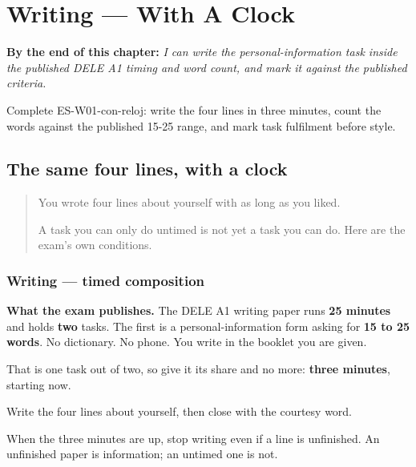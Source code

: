 
\chapter{Writing --- With A Clock}
\label{ch:escribir-con-reloj}

\begin{chapteropening}
\textbf{By the end of this chapter:} \emph{I can write the personal-information task inside the published DELE A1 timing and word count, and mark it against the published criteria.}

Complete ES-W01-con-reloj: write the four lines in three minutes, count the words against the published 15-25 range, and mark task fulfilment before style.
\end{chapteropening}

\section[Practice]{The same four lines, with a clock}

\label{lesson:ES-W01-con-reloj}



\begin{quote}
You wrote four lines about yourself with as long as you liked.

A task you can only do untimed is not yet a task you can do. Here are the exam's own conditions.
\end{quote}

\subsection*{Writing — timed composition}
\textbf{What the exam publishes.} The DELE A1 writing paper runs \textbf{25 minutes} and holds \textbf{two} tasks. The first is a personal-information form asking for \textbf{15 to 25 words}. No dictionary. No phone. You write in the booklet you are given.

That is one task out of two, so give it its share and no more: \textbf{three minutes}, starting now.

Write the four lines about yourself, then close with the courtesy word.

When the three minutes are up, stop writing even if a line is unfinished. An unfinished paper is information; an untimed one is not.

